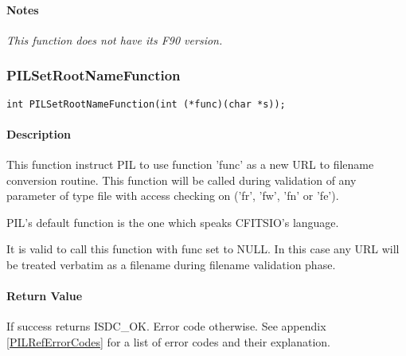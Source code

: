 \paragraph{Notes\\}
{\it
This function does not have its F90 version.
}



\subsubsection{PILSetRootNameFunction}\label{PILSetRootNameFunction}

\begin{verbatim}
int PILSetRootNameFunction(int (*func)(char *s));
\end{verbatim}

\paragraph{Description\\}
This function instruct PIL to use function 'func' as a new URL to filename
conversion routine. This function will be called during validation
of any parameter of type file with access checking on ('fr', 'fw', 'fn' or
'fe').

PIL's default function is the one which speaks CFITSIO's language. 

It is valid to call this function with func set to NULL. In this case
any URL will be treated verbatim as a filename during filename 
validation phase.

\paragraph{Return Value\\}
If success returns ISDC\_OK. Error code otherwise. See appendix \ref{PILRefErrorCodes}
for a list of error codes and their explanation.

